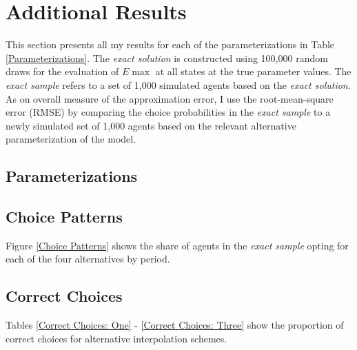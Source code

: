 \section{Additional Results}\label{Results}
This section presents all my results for each of the parameterizations in Table \ref{Parameterizations}. The \textit{exact solution} is constructed using 100,000 random draws for the evaluation of $E\max$ at all states at the true parameter values. The \textit{exact sample} refers to a set of 1,000 simulated agents based on the \textit{exact solution}. As on overall measure of the approximation error, I use the root-mean-square error (RMSE) by comparing the choice probabilities in the \textit{exact sample} to a newly simulated set of 1,000 agents based on the relevant alternative parameterization of the model.
\subsection{Parameterizations}

\subsection{Choice Patterns}
Figure \ref{Choice Patterns} shows the share of agents in the \textit{exact sample} opting for each of the four alternatives by period.\\\newline
\clearpage
\subsection{Correct Choices}
Tables \ref{Correct Choices: One} - \ref{Correct Choices: Three} show the proportion of correct choices for alternative interpolation schemes.



